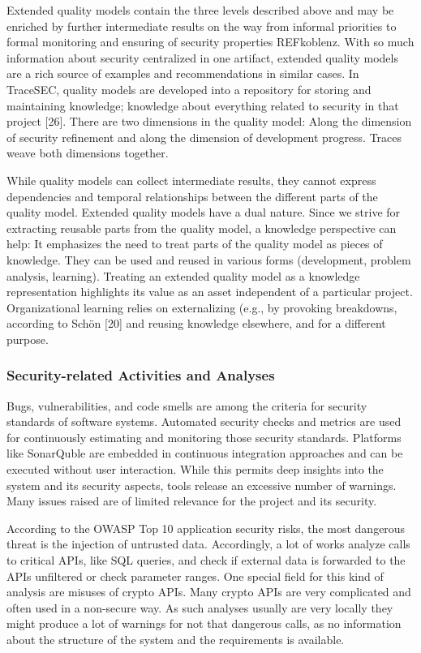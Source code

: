 Extended quality models contain the three levels described above and may be enriched by further intermediate results on the way from informal priorities to formal monitoring and ensuring of security properties REFkoblenz. With so much information about security centralized in one artifact, extended quality models are a rich source of examples and recommendations in similar cases. In TraceSEC, quality models are developed into a repository for storing and maintaining knowledge; knowledge about everything related to security in that project [26]. There are two dimensions in the quality model: Along the dimension of security refinement and along the dimension of development progress. Traces weave both dimensions together.

While quality models can collect intermediate results, they cannot express dependencies and temporal relationships between the different parts of the quality model. Extended quality models have a dual nature. Since we strive for extracting reusable parts from the quality model, a knowledge perspective can help: It emphasizes the need to treat parts of the quality model as pieces of knowledge. They can be used and reused in various forms (development, problem analysis, learning). Treating an extended quality model as a knowledge representation highlights its value as an asset independent of a particular project. Organizational learning relies on externalizing (e.g., by provoking breakdowns, according to Schön [20] and reusing knowledge elsewhere, and for a different purpose. 

\vspace{-0.5em}
\subsubsection*{Security-related Activities and Analyses}
\vspace{-1em}
Bugs, vulnerabilities, and code smells are among the criteria for security standards of software systems. Automated security checks and metrics are used for continuously estimating and monitoring those security standards. Platforms like SonarQuble are embedded in continuous integration approaches and can be executed without user interaction. While this permits deep insights into the system and its security aspects, tools release an excessive number of warnings. Many issues raised are of limited relevance for the project and its security.

According to the OWASP Top 10 application security risks, the most dangerous threat is the injection of untrusted data. Accordingly, a lot of works analyze calls to critical APIs, like SQL queries, and check if external data is forwarded to the APIs unfiltered or check parameter ranges. One special field for this kind of analysis are misuses of crypto APIs. Many crypto APIs are very complicated and often used in a non-secure way. As such analyses usually are very locally they might produce a lot of warnings for not that dangerous calls, as no information about the structure of the system and the requirements is available.

